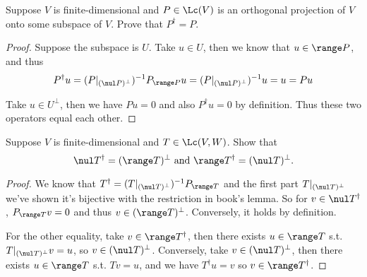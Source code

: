 \documentclass{extarticle}
\begin{document}


\begin{problem}{19}
    Suppose \(V\) is finite-dimensional and \(P \in \Lc(V)\) is an orthogonal projection of \(V\) onto
    some subspace of \(V\). Prove that \(P^\dagger = P\).
\end{problem}

\begin{proof}
Suppose the subspace is \(U\). Take \(u \in U\), then we know that \(u \in \range P\), and thus
\begin{align*}
    P^\dagger u = (P|_{(\nul P)^\perp})^{-1} P_{\range P} u =  (P|_{(\nul P)^\perp})^{-1} u  = u = Pu
\end{align*}

Take \(u \in U^\perp\), then we have \(Pu = 0\) and also \(P^\dagger u = 0\) by definition. Thus these two operators
equal each other.
\end{proof}

\begin{problem}{20}
    Suppose \(V\) is finite-dimensional and \(T \in \Lc(V, W)\). Show that
    \[\nul T^\dagger = (\range T)^\perp \text{  and  } \range T^\dagger = (\nul T)^\perp.\]
\end{problem}

\begin{proof}
We know that \(T^\dagger = (T|_{(\nul T)^\perp})^{-1} P_{\range T}\) and the first part \(T|_{(\nul T)^\perp}\)
we've shown it's bijective with the restriction in book's lemma. So for \(v \in \nul T^\dagger\),
\(P_{\range T}v = 0\) and thus \(v \in (\range T)^\perp\). Conversely, it holds by definition.

For the other equality, take \(v \in \range T^\dagger\), then there exists \(u \in \range T\) s.t.
\(T|_{(\nul T)^\perp} v = u\), so \(v \in (\nul T)^\perp\). Conversely, take \(v \in (\nul T)^\perp\), then
there exists \(u \in \range T\) s.t. \(Tv = u\), and we have \(T^\dagger u =v\) so \(v \in \range T^\dagger\).
\end{proof}
\end{document}
